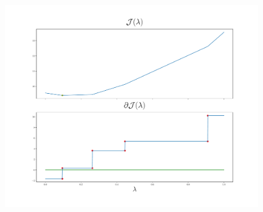 \documentclass[aspectratio=43]{beamer}
\begin{document}
\begin{frame}

      \begin{figure}[t!]
            \centering
            \includegraphics[width=.6\textwidth]{Chapter4/NeuroCom2021/ejemplo2_mae.pdf}
            \label{fig:sq_error}
        \end{figure}      

\end{frame}
\end{document}

